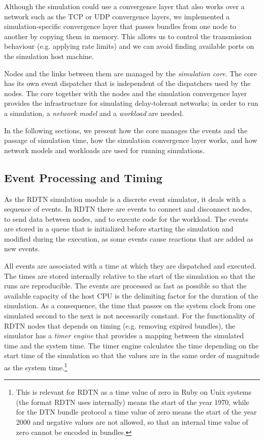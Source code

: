 \documentclass[a4paper]{article}
\begin{document}
Although the simulation could use a convergence layer that also works over a
network such as the TCP or UDP convergence layers, we implemented a
simulation-specific convergence layer that passes bundles from one node to
another by copying them in memory. This allows us to control the transmission
behaviour (e.g. applying rate limits) and we can avoid finding available ports
on the simulation host machine. 

Nodes and the links between them are managed by the {\em simulation core}.  The
core has its own event dispatcher that is independent of the dispatchers used by
the nodes. The core together with the nodes and the simulation convergence layer
provides the infrastructure for simulating delay-tolerant networks; in order to
run a simulation, a {\em network model} and a {\em workload} are needed. 

In the following sections, we present how the core manages the events and the
passage of simulation time, how the simulation convergence layer works, and how
network models and workloads are used for running simulations.

\subsection{Event Processing and Timing}\label{sec.sim.events}

As the RDTN simulation module is a discrete event simulator, it deals with a
sequence of events. In RDTN there are events to connect and disconnect nodes, to
send data between nodes, and to execute code for the workload. The events are
stored in a queue that is initialized before starting the simulation and
modified during the execution, as some events cause reactions that are added as
new events.

All events are associated with a time at which they are dispatched and executed.
The times are stored internally relative to the start of the simulation so that
the runs are reproducible. The events are processed as fast as possible so that
the available capacity of the host CPU is the delimiting factor for the duration
of the simulation. As a consequence, the time that passes on the system clock
from one simulated second to the next is not necessarily constant.  For the
functionality of RDTN nodes that depends on timing (e.g. removing expired
bundles), the simulator has a {\em timer engine} that provides a mapping between
the simulated time and the system time.  The timer engine calculates the time
depending on the start time of the simulation so that the values are in the same
order of magnitude as the system time.\footnote{This is relevant for RDTN as a
time value of zero in Ruby on Unix systems (the format RDTN uses internally)
means the start of the year 1970, while for the DTN bundle protocol a time value
of zero means the start of the year 2000 and negative values are not allowed, so
that an internal time value of zero cannot be encoded in bundles.}
\end{document}
